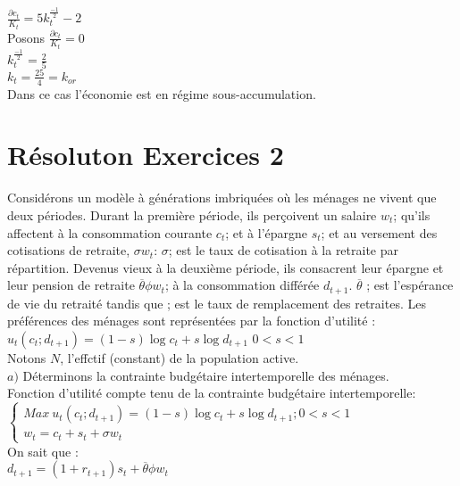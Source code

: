 \documentclass[11pt,twoside,a4paper]{article}
\begin{document}
 $\frac{\partial c_t}{K_t}=5k_t^\frac{-1}{2}-2$\\
 
  Posons $\frac{\partial c_t}{K_t}=0$\\
  $k_t^\frac{-1}{2}=\frac{2}{5}$\\
  $k_t=\frac{25}{4}=k_{or}$\\
  Dans ce cas l'économie est en régime sous-accumulation.\\
  
  \section*{Résoluton Exercices 2}
  
  Considérons un modèle à générations imbriquées où les ménages ne vivent que deux périodes. Durant la première période, ils perçoivent un salaire $w_t$; qu'ils affectent à la  consommation courante $c_t$; et à l'épargne $s_t$; et au versement des cotisations de retraite, $\sigma w_t$: $\sigma$; est le taux de cotisation à la retraite par répartition. Devenus vieux à la deuxième période, ils consacrent leur épargne et leur pension de retraite $\overline{\theta}\phi w_t$; à la consommation différée $d_{t+1}$.
$\overline{\theta}$ ; est l'espérance de vie du retraité tandis que ; est le taux de remplacement
des retraites. Les préférences des ménages sont représentées par la fonction d'utilité :\\
$u_t(c_t; d_{t+1})=(1-s)\log{c_t} + s\log{d_{t+1}}$ \: $0<s<1$
\\
Notons $N$, l'effctif (constant) de la population active.\\

$a)$ Déterminons la contrainte budgétaire intertemporelle des ménages.\\

Fonction d'utilité compte tenu de la contrainte budgétaire intertemporelle:\\

$ \left\{\begin{array}{rl}
 Max \ u_t(c_t; d_{t+1})=  (1-s)\log{c_t} + s\log{d_{t+1}} ; 0<s<1 \\
 
w_t  =  c_t + s_t +  \sigma w_t \end{array}\right. $  \\

On sait que :\\

$d_{t+1}=(1+r_{t+1})s_t+\overline{\theta}\phi w_t$\\
\end{document}
